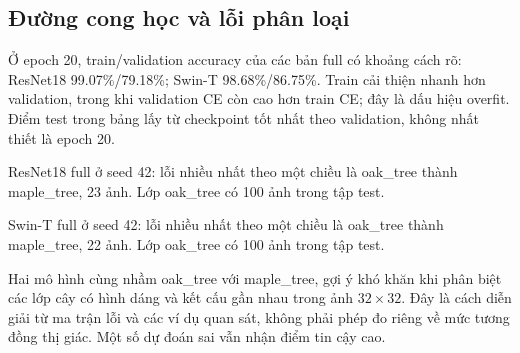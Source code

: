 \subsection{Đường cong học và lỗi phân loại}
Ở epoch 20, train/validation accuracy của các bản full có khoảng cách rõ: ResNet18 99.07\%/79.18\%; Swin-T 98.68\%/86.75\%. Train cải thiện nhanh hơn validation, trong khi validation CE còn cao hơn train CE; đây là dấu hiệu overfit. Điểm test trong bảng lấy từ checkpoint tốt nhất theo validation, không nhất thiết là epoch 20.

ResNet18 full ở seed 42: lỗi nhiều nhất theo một chiều là oak\_tree thành maple\_tree, 23 ảnh. Lớp oak\_tree có 100 ảnh trong tập test.

Swin-T full ở seed 42: lỗi nhiều nhất theo một chiều là oak\_tree thành maple\_tree, 22 ảnh. Lớp oak\_tree có 100 ảnh trong tập test.

Hai mô hình cùng nhầm oak\_tree với maple\_tree, gợi ý khó khăn khi phân biệt các lớp cây có hình dáng và kết cấu gần nhau trong ảnh $32\times32$. Đây là cách diễn giải từ ma trận lỗi và các ví dụ quan sát, không phải phép đo riêng về mức tương đồng thị giác. Một số dự đoán sai vẫn nhận điểm tin cậy cao.

